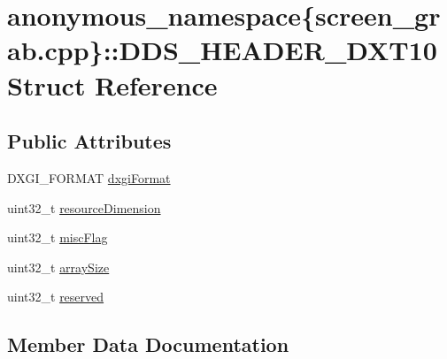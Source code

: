 \hypertarget{structanonymous__namespace_02screen__grab_8cpp_03_1_1_d_d_s___h_e_a_d_e_r___d_x_t10}{}\section{anonymous\+\_\+namespace\{screen\+\_\+grab.\+cpp\}\+:\+:D\+D\+S\+\_\+\+H\+E\+A\+D\+E\+R\+\_\+\+D\+X\+T10 Struct Reference}
\label{structanonymous__namespace_02screen__grab_8cpp_03_1_1_d_d_s___h_e_a_d_e_r___d_x_t10}
\subsection*{Public Attributes}
\begin{DoxyCompactItemize}
\item 
D\+X\+G\+I\+\_\+\+F\+O\+R\+M\+AT \mbox{\hyperlink{structanonymous__namespace_02screen__grab_8cpp_03_1_1_d_d_s___h_e_a_d_e_r___d_x_t10_a002cd5dec0e481f085514dc3396e1bea}{dxgi\+Format}}
\item 
uint32\+\_\+t \mbox{\hyperlink{structanonymous__namespace_02screen__grab_8cpp_03_1_1_d_d_s___h_e_a_d_e_r___d_x_t10_ac2187dee9c1af613965f1ba07d84634e}{resource\+Dimension}}
\item 
uint32\+\_\+t \mbox{\hyperlink{structanonymous__namespace_02screen__grab_8cpp_03_1_1_d_d_s___h_e_a_d_e_r___d_x_t10_acd8f9063edc4c70f65ce4a16f402d041}{misc\+Flag}}
\item 
uint32\+\_\+t \mbox{\hyperlink{structanonymous__namespace_02screen__grab_8cpp_03_1_1_d_d_s___h_e_a_d_e_r___d_x_t10_af3da0dfea4e2261f833f7815372a11bc}{array\+Size}}
\item 
uint32\+\_\+t \mbox{\hyperlink{structanonymous__namespace_02screen__grab_8cpp_03_1_1_d_d_s___h_e_a_d_e_r___d_x_t10_a3dbd99abbb9531dcb6f9c9c013b9ba47}{reserved}}
\end{DoxyCompactItemize}


\subsection{Member Data Documentation}
\mbox{\label{structanonymous__namespace_02screen__grab_8cpp_03_1_1_d_d_s___h_e_a_d_e_r___d_x_t10_af3da0dfea4e2261f833f7815372a11bc}} 

